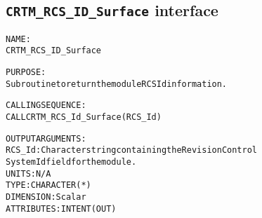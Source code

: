 \subsection{\texttt{CRTM\_RCS\_ID\_Surface} interface}
  \label{sec:CRTM_RCS_ID_Surface_interface}
  \begin{alltt}
 
  NAME:
        CRTM_RCS_ID_Surface
 
  PURPOSE:
        Subroutine to return the module RCS Id information.
 
  CALLING SEQUENCE:
        CALL CRTM_RCS_Id_Surface( RCS_Id )
 
  OUTPUT ARGUMENTS:
        RCS_Id:        Character string containing the Revision Control
                       System Id field for the module.
                       UNITS:      N/A
                       TYPE:       CHARACTER(*)
                       DIMENSION:  Scalar
                       ATTRIBUTES: INTENT(OUT)
 
  \end{alltt}
